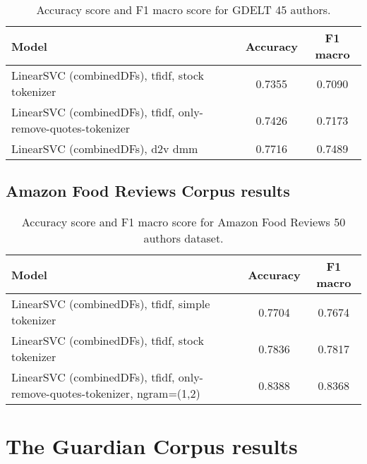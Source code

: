 \begin{table}[h!]
	\begin{center}  
		\caption[GDELT Results - 45 authors]{Accuracy score and F1 macro score for GDELT 45 authors.} 
		\label{tab:tableGDELT}
		\begin{tabular}{| p{5 cm} | c | c |}
			\hline 
			Model & Accuracy & F1 macro \\
			\hline
			LinearSVC (combinedDFs), tfidf, stock tokenizer & 0.7355 & 0.7090 \\ \hline
			LinearSVC (combinedDFs), tfidf, only-remove-quotes-tokenizer & 0.7426 & 0.7173 \\ \hline
			LinearSVC (combinedDFs), d2v dmm & 0.7716 & 0.7489 \\ \hline
		\end{tabular} 
	\end{center}
\end{table}


\subsection{Amazon Food Reviews Corpus results}

\begin{table}[h!]
	\begin{center}  
		\caption[Amazon Food Reviews Results - 50 authors]{Accuracy score and F1 macro score for Amazon Food Reviews 50 authors dataset.} 
		\label{tab:tableAFR}
		\begin{tabular}{| p{5 cm} | c | c |}
			\hline 
			Model & Accuracy & F1 macro \\
			\hline
			LinearSVC (combinedDFs), tfidf, simple tokenizer & 0.7704 & 0.7674 \\ \hline
			LinearSVC (combinedDFs), tfidf, stock tokenizer & 0.7836 & 0.7817 \\ \hline
			LinearSVC (combinedDFs), tfidf, only-remove-quotes-tokenizer,
			ngram=(1,2) & 0.8388 & 0.8368 \\ \hline
		\end{tabular} 
	\end{center}
\end{table}

\section{The Guardian Corpus results}

